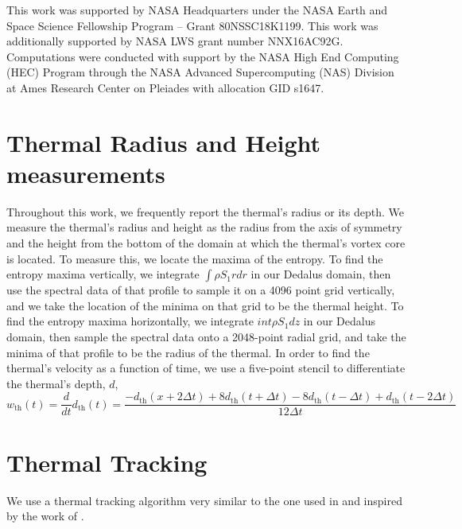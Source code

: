 \documentclass[twocolumn, amsmath, amsfonts, amssymb, trackchanges]{aastex62}
\begin{document}
\begin{acknowledgements}
This work was supported by NASA Headquarters under the NASA Earth and Space Science Fellowship Program -- Grant 80NSSC18K1199.
This work was additionally supported by  NASA LWS grant number NNX16AC92G.  
Computations were conducted with support by the NASA High End Computing (HEC) Program through the NASA  Advanced Supercomputing (NAS) Division at Ames Research Center on Pleiades with allocation GID s1647.
\end{acknowledgements}

\appendix
\section{Thermal Radius and Height measurements}
\label{appendix:radius}
Throughout this work, we frequently report the thermal's radius or its depth.
We measure the thermal's radius and height as the radius from the axis of symmetry and the height from the bottom of the domain at which the thermal's vortex core is located.
To measure this, we locate the maxima of the entropy.
To find the entropy maxima vertically, we integrate $\int\rho S_1 r dr$ in our Dedalus domain, then use the spectral data of that profile to sample it on a 4096 point grid vertically, and we take the location of the minima on that grid to be the thermal height.
To find the entropy maxima horizontally, we integrate $int \rho S_1 dz$ in our Dedalus domain, then sample the spectral data onto a 2048-point radial grid, and take the minima of that profile to be the radius of the thermal.
In order to find the thermal's velocity as a function of time, we use a five-point stencil to differentiate the thermal's depth, $d$,
$$
w_{\text{th}}(t) = \frac{d }{dt}d_{\text{th}}(t) = \frac{-d_{\text{th}}(x + 2\Delta t) + 8d_{\text{th}}(t + \Delta t) - 8 d_{\text{th}}(t - \Delta t) + d_{\text{th}}(t - 2\Delta t)}{12\Delta t}
$$

\section{Thermal Tracking}
\label{appendix:tracking}
We use a thermal tracking algorithm very similar to the one used in  \citet{lecoanet&jeevanjee2018} and inspired by the work of \citet{romps&all2015}. 
\end{document}
